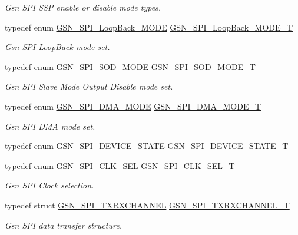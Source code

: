 \begin{DoxyCompactItemize}
\begin{DoxyCompactList}\small\item\em Gsn SPI SSP enable or disable mode types. \end{DoxyCompactList}\item 
typedef enum \hyperlink{a00655_ga64d5d284cb01ecc3c94f83cd0b22fea0}{GSN\_\-SPI\_\-LoopBack\_\-MODE} \hyperlink{a00655_ga6f83091cbd86860cdb531eb6c520660e}{GSN\_\-SPI\_\-LoopBack\_\-MODE\_\-T}
\begin{DoxyCompactList}\small\item\em Gsn SPI LoopBack mode set. \end{DoxyCompactList}\item 
typedef enum \hyperlink{a00655_gad8f5cb14958ae6607aad0159bf3dc5b4}{GSN\_\-SPI\_\-SOD\_\-MODE} \hyperlink{a00655_ga5662413f1ff6b81e835e7c5412916d4b}{GSN\_\-SPI\_\-SOD\_\-MODE\_\-T}
\begin{DoxyCompactList}\small\item\em Gsn SPI Slave Mode Output Disable mode set. \end{DoxyCompactList}\item 
typedef enum \hyperlink{a00655_ga5877a1a4dee99757a5560a974edd42ca}{GSN\_\-SPI\_\-DMA\_\-MODE} \hyperlink{a00655_gafff743b26bbfafb380a9797457935a0e}{GSN\_\-SPI\_\-DMA\_\-MODE\_\-T}
\begin{DoxyCompactList}\small\item\em Gsn SPI DMA mode set. \end{DoxyCompactList}\item 
typedef enum \hyperlink{a00587_acadb33517f6f254dce30d69f644a88c6}{GSN\_\-SPI\_\-DEVICE\_\-STATE} \hyperlink{a00587_a6a9138b2111d919287d97122c32fbc02}{GSN\_\-SPI\_\-DEVICE\_\-STATE\_\-T}
\item 
typedef enum \hyperlink{a00655_ga26d561511c040815639b118310656f40}{GSN\_\-SPI\_\-CLK\_\-SEL} \hyperlink{a00655_gac4a300710a224a1971e5a78eae8eb89e}{GSN\_\-SPI\_\-CLK\_\-SEL\_\-T}
\begin{DoxyCompactList}\small\item\em Gsn SPI Clock selection. \end{DoxyCompactList}\item 
typedef struct \hyperlink{a00241}{GSN\_\-SPI\_\-TXRXCHANNEL} \hyperlink{a00655_ga0cdbeb0b657e6192938aebc1aaf793de}{GSN\_\-SPI\_\-TXRXCHANNEL\_\-T}
\begin{DoxyCompactList}\small\item\em Gsn SPI data transfer structure. \end{DoxyCompactList}\item 

\end{DoxyCompactItemize}
